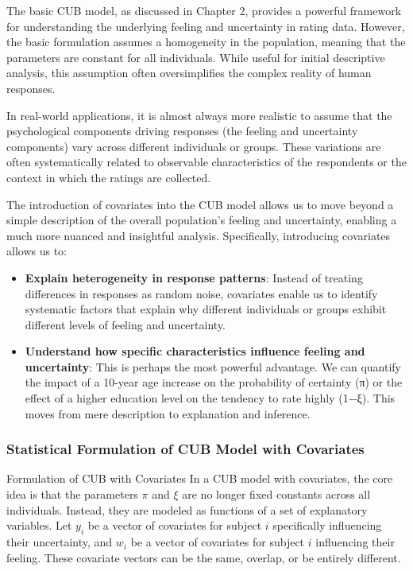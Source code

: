 \documentclass[
  letterpaper,
  DIV=11,
  numbers=noendperiod]{scrartcl}
\begin{document}
The basic CUB model, as discussed in Chapter 2, provides a powerful
framework for understanding the underlying feeling and uncertainty in
rating data. However, the basic formulation assumes a homogeneity in the
population, meaning that the parameters are constant for all
individuals. While useful for initial descriptive analysis, this
assumption often oversimplifies the complex reality of human responses.

In real-world applications, it is almost always more realistic to assume
that the psychological components driving responses (the feeling and
uncertainty components) vary across different individuals or groups.
These variations are often systematically related to observable
characteristics of the respondents or the context in which the ratings
are collected.

The introduction of covariates into the CUB model allows us to move
beyond a simple description of the overall population's feeling and
uncertainty, enabling a much more nuanced and insightful analysis.
Specifically, introducing covariates allows us to:

\begin{itemize}
\item
  \textbf{Explain heterogeneity in response patterns}: Instead of
  treating differences in responses as random noise, covariates enable
  us to identify systematic factors that explain why different
  individuals or groups exhibit different levels of feeling and
  uncertainty.
\item
  \textbf{Understand how specific characteristics influence feeling and
  uncertainty}: This is perhaps the most powerful advantage. We can
  quantify the impact of a 10-year age increase on the probability of
  certainty (π) or the effect of a higher education level on the
  tendency to rate highly (1−ξ). This moves from mere description to
  explanation and inference.
\end{itemize}

\hypertarget{statistical-formulation-of-cub-model-with-covariates}{%
\subsubsection{Statistical Formulation of CUB Model with
Covariates}\label{statistical-formulation-of-cub-model-with-covariates}}

Formulation of CUB with Covariates In a CUB model with covariates, the
core idea is that the parameters \(\pi\) and \(\xi\) are no longer fixed
constants across all individuals. Instead, they are modeled as functions
of a set of explanatory variables. Let \(y_i\) be a vector of covariates
for subject \(i\) specifically influencing their uncertainty, and
\(w_i\) be a vector of covariates for subject \(i\) influencing their
feeling. These covariate vectors can be the same, overlap, or be
entirely different.
\end{document}
